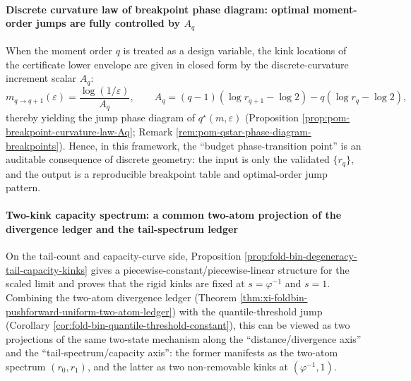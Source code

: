 \paragraph{Discrete curvature law of breakpoint phase diagram: optimal moment-order jumps are fully controlled by \texorpdfstring{$A_q$}{Aq}}
When the moment order \(q\) is treated as a design variable, the kink locations of the certificate lower envelope are given in closed form by the discrete-curvature increment scalar \(A_q\):
\[
m_{q\to q+1}(\varepsilon)=\frac{\log(1/\varepsilon)}{A_q},
\qquad
A_q=(q-1)(\log r_{q+1}-\log2)-q(\log r_q-\log2),
\]
thereby yielding the jump phase diagram of \(q^\star(m,\varepsilon)\) (Proposition \ref{prop:pom-breakpoint-curvature-law-Aq}; Remark \ref{rem:pom-qstar-phase-diagram-breakpoints}).
Hence, in this framework, the ``budget phase-transition point'' is an auditable consequence of discrete geometry: the input is only the validated \(\{r_q\}\), and the output is a reproducible breakpoint table and optimal-order jump pattern.

\paragraph{Two-kink capacity spectrum: a common two-atom projection of the divergence ledger and the tail-spectrum ledger}
On the tail-count and capacity-curve side, Proposition \ref{prop:fold-bin-degeneracy-tail-capacity-kinks} gives a piecewise-constant/piecewise-linear structure for the scaled limit and proves that the rigid kinks are fixed at
\(
s=\varphi^{-1}
\)
and
\(
s=1
\).
Combining the two-atom divergence ledger (Theorem \ref{thm:xi-foldbin-pushforward-uniform-two-atom-ledger}) with the quantile-threshold jump (Corollary \ref{cor:fold-bin-quantile-threshold-constant}), this can be viewed as two projections of the same two-state mechanism along the ``distance/divergence axis'' and the ``tail-spectrum/capacity axis'': the former manifests as the two-atom spectrum \((r_0,r_1)\), and the latter as two non-removable kinks at \((\varphi^{-1},1)\).

